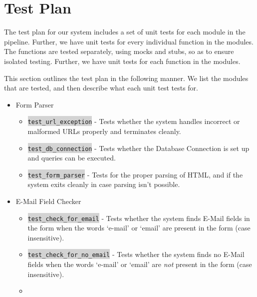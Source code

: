 \section{Test Plan}
\label{Arch:Test}
The test plan for our system includes a set of unit tests for each module in the pipeline. Further, we have unit tests for every %
individual function in the modules. The functions are tested separately, using mocks and stubs, so as to ensure isolated testing. Further, we have unit tests for each function in the modules.

This section outlines the test plan in the following manner. We list the modules that are tested, and then describe what each unit test tests for.
\begin{itemize}
	\item Form Parser
	\begin{itemize}
		\item \colorbox{lightgray}{\lstinline{test_url_exception}} - Tests whether the system handles incorrect or malformed URLs properly and terminates cleanly.
		\item \colorbox{lightgray}{\lstinline{test_db_connection}} - Tests whether the Database Connection is set up and queries can be executed.
		\item \colorbox{lightgray}{\lstinline{test_form_parser}} - Tests for the proper parsing of HTML, and if the system exits cleanly in case parsing isn't possible.
	\end{itemize}
	
	\item E-Mail Field Checker
	\begin{itemize}
		\item \colorbox{lightgray}{\lstinline{test_check_for_email}} - Tests whether the system finds E-Mail fields in the form when the words `e-mail' or `email' are present in the form (case insensitive).
		
		\item \colorbox{lightgray}{\lstinline{test_check_for_no_email}} - Tests whether the system finds no E-Mail fields when the words `e-mail' or `email' are \emph{not} present in the form (case insensitive).
		\item
	\end{itemize}
	

\end{itemize}
